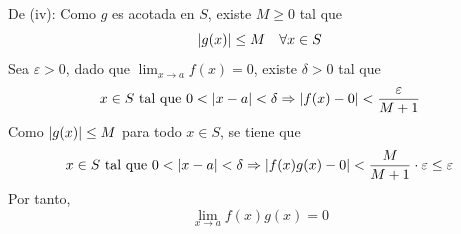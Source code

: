 \documentclass[12pt]{article}
\begin{document}
\begin{enumerate}
\begin{sol}
        De (iv): Como $g$ es acotada en $S$, existe $M\geq0$ tal que
        \begin{equation*}
            \left| g(x) \right|\leq M\quad\forall x\in S
        \end{equation*}
        Sea $\varepsilon>0$, dado que $\lim_{ x\rightarrow a}f(x)=0$, existe $\delta>0$ tal que
        \begin{equation*}
            x\in S\textup{ tal que }0<\left| x-a \right|<\delta\Rightarrow\left| f(x)-0 \right|<\frac{\varepsilon}{M+1}
        \end{equation*}
        Como $\left| g(x) \right|\leq M$ para todo $x\in S$, se tiene que
        \begin{equation*}
            x\in S\textup{ tal que }0<\left| x-a \right|<\delta\Rightarrow\left| f(x)g(x)-0 \right|<\frac{M}{M+1}\cdot\varepsilon\leq\varepsilon
        \end{equation*}
        Por tanto,
        \begin{equation*}
            \lim_{ x\rightarrow a}f(x)g(x)=0
        \end{equation*}
    \end{sol}


\end{enumerate}
\end{document}
